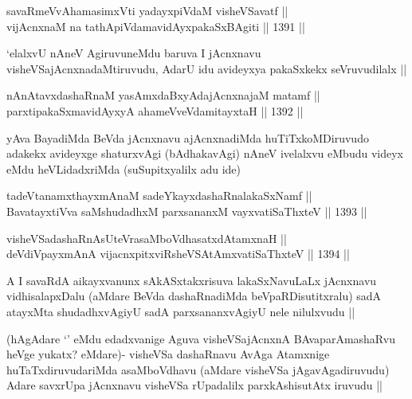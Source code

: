 
\begin{shl}
savaRmeVvAhamasimxVti yadayxpiVdaM visheVSavatf || \\
vijAcnxnaM na tathA\s piVdamavidAyxpakaSxBAgiti \hfill || 1391 ||  
\end{shl}

\begin{artha}
`elalxvU nAneV AgiruvuneMdu baruva I jAcnxnavu visheVSajAcnxnadaMtiruvudu, AdarU idu avideyxya pakaSxkekx seVruvudilalx ||
\end{artha}


\begin{shl}
nAnAtavxdashaRnaM yasAmxdaBxyAdajAcnxnajaM matamf || \\
parxtipakaSxmavidAyxyA ahameVveVdamitayxtaH \hfill || 1392 ||  
\end{shl}

\begin{artha}
yAva BayadiMda BeVda jAcnxnavu ajAcnxnadiMda huTiTxkoMDiruvudo adakekx avideyxge shaturxvAgi (bAdhakavAgi) nAneV ivelalxvu eMbudu videyx eMdu heVLidadxriMda (suSupitxyalilx adu ide)
\end{artha}

\begin{shl}
tadeVtanamxthayxmAnaM sadeYkayxdashaRnalakaSxNamf || \\
BavatayxtiVva saMshudadhxM parxsananxM vayxvatiSaThxteV \hfill || 1393 ||  
\end{shl}
				
\begin{shl}
visheVSadashaRnAsUteVrasaMboVdhasatxdA\s \s tamxnaH || \\
deVdiVpayxmAnA vijacnxpitxviRsheVSAtAmx\s vatiSaThxteV \hfill || 1394 ||  
\end{shl}

\begin{artha}
A I savaRdA aikayxvanunx sAkASxtakxrisuva lakaSxNavuLaLx jAcnxnavu vidhisalapxDalu (aMdare BeVda dashaRnadiMda beVpaRDisutitxralu) sadA atayxMta shudadhxvAgiyU sadA parxsananxvAgiyU nele nilulxvudu ||
\end{artha}

\begin{artha}
(hAgAdare `\stext' eMdu edadxvanige Aguva visheVSajAcnxnA BAvaparAmashaRvu heVge yukatx? eMdare)- visheVSa dashaRnavu AvAga Atamxnige huTaTxdiruvudariMda asaMboVdhavu (aMdare visheVSa jAgavAgadiruvudu) Adare savxrUpa jAcnxnavu visheVSa rUpadalilx parxkAshisutAtx iruvudu ||
\end{artha}

